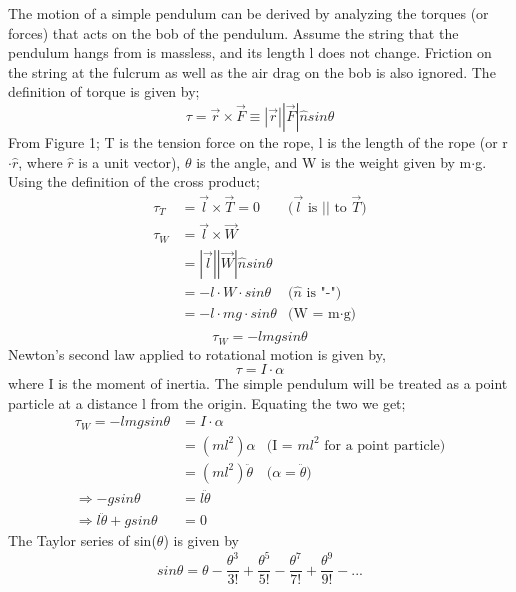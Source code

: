 \documentclass[iop]{emulateapj}
\begin{document}
\begin{figure*}
The motion of a simple pendulum can be derived by analyzing the torques (or forces) that acts 
on the bob of the pendulum. Assume the string that the pendulum hangs from is massless, and
its length l does not change. Friction on the string at the fulcrum as well as the
air drag on the bob is also ignored. The definition of torque is given by;
\begin{equation}
\boxed{\tau = \vec{r} \times \vec{F} \equiv |\vec{r}||\vec{F}|\hat{n}sin\theta}
\end{equation}
From Figure 1; T is the tension force on the rope, l is the length of the
rope (or r$\cdot\hat{r}$, where $\hat{r}$ is a unit vector), $\theta$ is the angle, and W is the weight given by m$\cdot$g.
Using the definition of the cross product;
\begin{align*}
\tau_T & = \vec{l} \times \vec{T} = 0 & \text{($\vec{l}$ is $||$ to $\vec{T}$)}\\
\tau_W & = \vec{l} \times \vec{W}\\
& = |\vec{l}||\vec{W}|\hat{n}sin\theta\\
& = -l\cdot W\cdot sin\theta & \text{($\hat{n}$ is "-")}\\
& = -l\cdot mg\cdot sin\theta & \text{(W = m$\cdot$g)}\\
\end{align*}
\begin{equation}
\boxed{\tau_W = -lmgsin\theta}
\end{equation}
Newton's second law applied to rotational motion is given by,
\begin{equation}
\tau = I\cdot\alpha
\end{equation}
where I is the moment of inertia. The simple pendulum will be 
treated as a point particle at a distance l from the origin.
Equating the two we get;
\begin{align*}
\tau_W = -lmgsin\theta & = I\cdot\alpha\\
& = (ml^2)\alpha & \text{(I = $ml^2$ for a point particle)}\\
& = (ml^2)\ddot{\theta} & \text{($\alpha = \ddot{\theta}$)}\\
\Rightarrow -gsin\theta & = l\ddot{\theta}\\
\Rightarrow l\ddot{\theta} + gsin\theta & = 0
\end{align*}
The Taylor series of sin($\theta$) is given by
\begin{equation}
\boxed{sin\theta = \theta - \frac{\theta^3}{3!} + \frac{\theta^5}{5!} - \frac{\theta^7}{7!} + \frac{\theta^9}{9!} - ...}
\end{equation}

\end{figure*}
\end{document}
